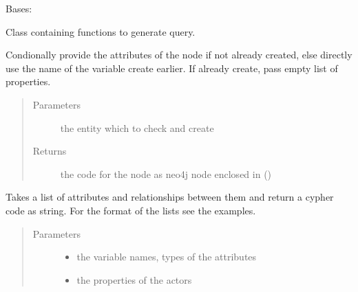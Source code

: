 \documentclass[letterpaper,10pt,english]{sphinxmanual}
\begin{document}
\begin{fulllineitems}
\label{\detokenize{neo4j_query_generation:generate_queries.CreateQuery}}
Bases: 

Class containing functions to generate query.

\begin{fulllineitems}
\label{\detokenize{neo4j_query_generation:generate_queries.CreateQuery.conditional_create}}
Condionally provide the attributes of the node if not already created, else directly use the name of the variable create earlier.
If already create, pass empty list of properties.
\begin{quote}\begin{description}
\item[{Parameters}] \leavevmode
{} \textendash{} the entity which to check and create

\item[{Returns}] \leavevmode
the code for the node as neo4j node enclosed in ()

\end{description}\end{quote}

\end{fulllineitems}


\begin{fulllineitems}
\label{\detokenize{neo4j_query_generation:generate_queries.CreateQuery.create_query}}
Takes a list of attributes and relationships between them and return a cypher code as string.
For the format of the lists see the examples.
\begin{quote}\begin{description}
\item[{Parameters}] \leavevmode\begin{itemize}
\item {} 
 \textendash{} the variable names, types of the attributes

\item {} 
 \textendash{} the properties of the actors


\end{itemize}
\end{description}
\end{quote}
\end{fulllineitems}
\end{fulllineitems}
\end{document}
